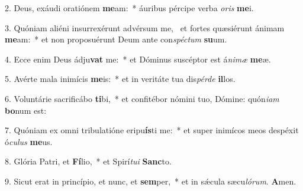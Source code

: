 2. Deus, exáudi oratiónem \textbf{me}am:~*  áuribus pércipe verba \textit{o}\textit{ris} \textbf{me}i.\

3. Quóniam aliéni insurrexérunt advérsum me, \dag\  et fortes quæsiérunt ánimam \textbf{me}am:~*  et non proposuérunt Deum ante con\textit{spéc}\textit{tum} \textbf{su}um.\

4. Ecce enim Deus ádju\textbf{vat} me:~*  et Dóminus suscéptor est á\textit{ni}\textit{mæ} \textbf{me}æ.\

5. Avérte mala inimícis \textbf{me}is:~*  et in veritáte tua dis\textit{pér}\textit{de} \textbf{il}los.\

6. Voluntárie sacrificábo \textbf{ti}bi,~*  et confitébor nómini tuo, Dómine: quón\textit{i}\textit{am} \textbf{bo}num est:\

7. Quóniam ex omni tribulatióne eripu\textbf{ís}ti me:~*  et super inimícos meos despéxit ó\textit{cu}\textit{lus} \textbf{me}us.\

8. Glória Patri, et \textbf{Fí}lio,~*  et Spirí\textit{tu}\textit{i} \textbf{Sanc}to.\

9. Sicut erat in princípio, et nunc, et \textbf{sem}per,~*  et in sǽcula sæcu\textit{ló}\textit{rum}. \textbf{A}men.\


